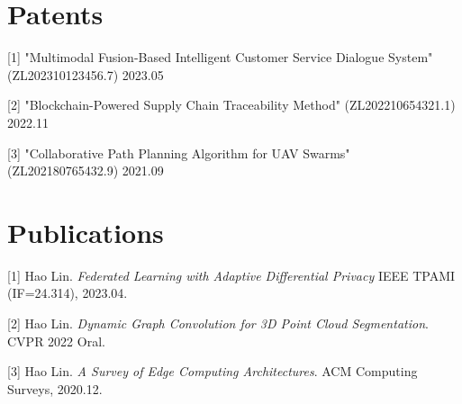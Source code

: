 \documentclass{cls/simplecv}
\begin{document}
\section{Patents}

[1] "Multimodal Fusion-Based Intelligent Customer Service Dialogue System" (ZL202310123456.7) 2023.05

[2] "Blockchain-Powered Supply Chain Traceability Method" (ZL202210654321.1) 2022.11

[3] "Collaborative Path Planning Algorithm for UAV Swarms" (ZL202180765432.9) 2021.09


\section{Publications}
[1] Hao Lin. \emph{Federated Learning with Adaptive Differential Privacy}
IEEE TPAMI (IF=24.314), 2023.04.

[2] Hao Lin. \emph{Dynamic Graph Convolution for 3D Point Cloud Segmentation}. CVPR 2022 Oral.

[3] Hao Lin. \emph{A Survey of Edge Computing Architectures}. ACM Computing Surveys, 2020.12.
\end{document}
